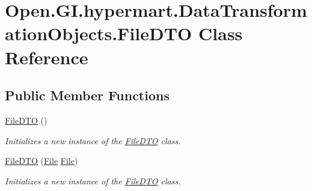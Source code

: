 \hypertarget{class_open_1_1_g_i_1_1hypermart_1_1_data_transformation_objects_1_1_file_d_t_o}{}\section{Open.\+G\+I.\+hypermart.\+Data\+Transformation\+Objects.\+File\+D\+TO Class Reference}
\label{class_open_1_1_g_i_1_1hypermart_1_1_data_transformation_objects_1_1_file_d_t_o}


 


\subsection*{Public Member Functions}
\begin{DoxyCompactItemize}
\item 
\hyperlink{class_open_1_1_g_i_1_1hypermart_1_1_data_transformation_objects_1_1_file_d_t_o_ae0da87388dbf076d2aa151cce63c81a8}{File\+D\+TO} ()
\begin{DoxyCompactList}\small\item\em Initializes a new instance of the \hyperlink{class_open_1_1_g_i_1_1hypermart_1_1_data_transformation_objects_1_1_file_d_t_o}{File\+D\+TO} class. \end{DoxyCompactList}\item 
\hyperlink{class_open_1_1_g_i_1_1hypermart_1_1_data_transformation_objects_1_1_file_d_t_o_add1a3ae47dca46ed24d3d8dda310a3a2}{File\+D\+TO} (\hyperlink{class_open_1_1_g_i_1_1hypermart_1_1_models_1_1_file}{File} \hyperlink{class_open_1_1_g_i_1_1hypermart_1_1_models_1_1_file}{File})
\begin{DoxyCompactList}\small\item\em Initializes a new instance of the \hyperlink{class_open_1_1_g_i_1_1hypermart_1_1_data_transformation_objects_1_1_file_d_t_o}{File\+D\+TO} class. \end{DoxyCompactList}\end{DoxyCompactItemize}
